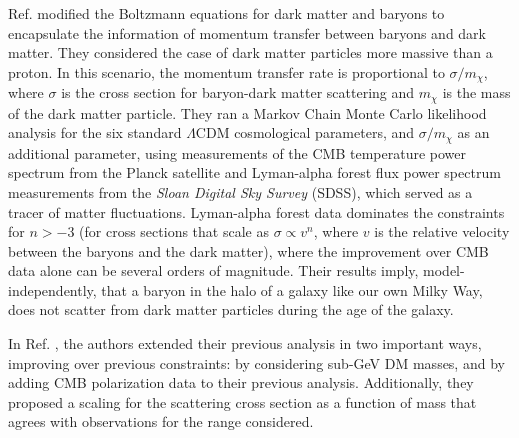 \documentclass[12pt]{article}
\begin{document}
Ref. \cite{Dvorkin:2013cea} modified the Boltzmann equations for dark matter and baryons to encapsulate the information of momentum transfer between baryons and dark matter.
They considered the case of dark matter particles more massive than a proton. In this scenario, the momentum transfer rate is proportional to $\sigma/m_\chi$, where $\sigma$ is the cross section for baryon-dark matter scattering and $m_\chi$ is the mass of the dark matter particle.
They ran a Markov Chain Monte Carlo likelihood analysis for the six standard $\Lambda$CDM cosmological parameters, and $\sigma/m_\chi$ as an additional parameter, using measurements of the CMB temperature power spectrum from the Planck satellite and Lyman-alpha forest flux power spectrum measurements from the {\it Sloan Digital Sky Survey} (SDSS), which served as a tracer of matter fluctuations. 
Lyman-alpha forest data dominates the constraints for $n>-3$ (for cross sections that scale as $\sigma\propto v^n$, where $v$ is the relative velocity between the baryons and the dark matter), where the improvement over CMB data alone can be several orders of magnitude.
Their results imply, model-independently, that a baryon in the halo of a galaxy like our own Milky Way, does not scatter from dark matter particles during the age of the galaxy. 

In Ref. \cite{Xu:2018efh}, the authors extended their previous analysis in two important ways, improving over previous constraints:
by considering sub-GeV DM masses, and by adding CMB polarization data to their previous analysis. Additionally, they proposed a scaling for the scattering cross section as a function of mass that agrees with observations for the range considered. 
\end{document}
